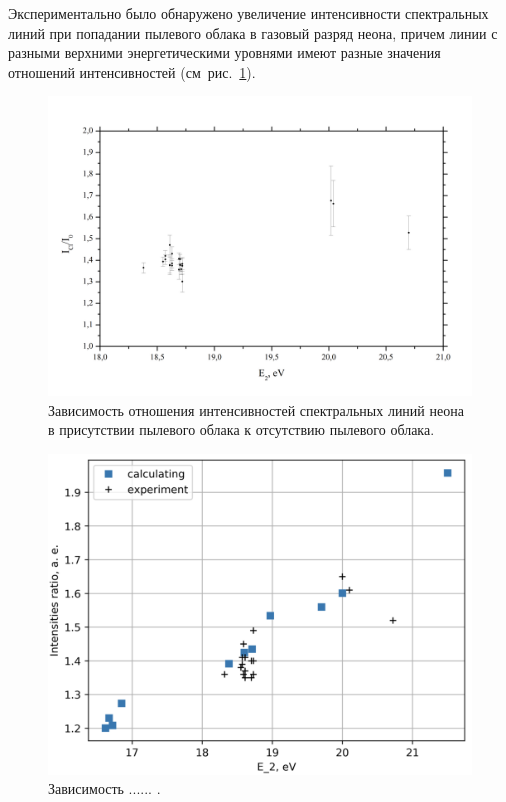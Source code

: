 Экспериментально было обнаружено увеличение интенсивности спектральных линий при попадании пылевого облака
в газовый разряд неона, причем линии с разными верхними энергетическими уровнями имеют разные значения
отношений интенсивностей (см~рис.~\ref{fig:fig35}).
\begin{figure}[t]
    \centering
    \includegraphics[width=16cm]{figures/fig35}
    \caption{Зависимость отношения интенсивностей спектральных линий неона в присутствии пылевого облака к отсутствию пылевого облака.}
    \label{fig:fig35}
\end{figure}







\begin{figure}[t]
  \centering
  \includegraphics[width=16cm]{figures/fig16}
  \caption{Зависимость ...... .}
  \label{fig:fig16}
\end{figure}
